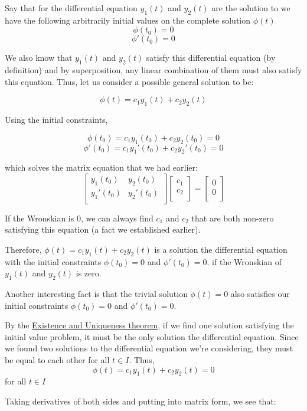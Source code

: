 \documentclass{report}
\begin{document}
Say that for the differential equation $y_1(t)$ and $y_2(t)$ are the solution to we have the following arbitrarily initial values on the complete solution $\phi(t)$
$$\phi(t_0) = 0$$
$$\phi'(t_0) = 0$$


We also know that $y_1(t)$ and $y_2(t)$ satisfy this differential equation (by definition) and by superposition, any linear combination of them must also satisfy this equation. Thus, let us consider a possible  general solution to be:

$$\phi(t) = c_1y_1(t) +c_2y_2(t)$$

Using the initial constraints,

$$\phi(t_0) = c_1y_1(t_0) +c_2y_2(t_0) = 0$$
$$\phi'(t_0) = c_1y_1'(t_0) +c_2y_2'(t_0) = 0$$

which solves the matrix equation that we had earlier:
$$
\begin{bmatrix}
    y_1(t_0) & y_2(t_0) \\
    y_1'(t_0) & y_2'(t_0) \\
\end{bmatrix}
\begin{bmatrix}
    c_1 \\
    c_2 \\
\end{bmatrix}
=
\begin{bmatrix}
    0 \\
    0 \\
\end{bmatrix}
$$

If the Wronskian is 0, we can always find $c_1$ and $c_2$ that are both non-zero satisfying this equation (a fact we established earlier). 

Therefore, $\phi(t) = c_1y_1(t) + c_2y_2(t)$ is a solution the differential equation with the initial constraints $\phi(t_0) = 0$ and $\phi'(t_0) = 0$. if the Wronskian of $y_1(t)$ and $y_2(t)$ is zero. 

Another interesting fact is that the trivial solution $\phi(t) = 0$ also satisfies our initial constraints $\phi(t_0) = 0$ and $\phi'(t_0) = 0$.

By the  \hyperref[th:Ex&Un]{Existence and Uniqueness theorem}, if we find one solution satisfying the initial value problem, it must be the only solution the differential equation. Since we found two solutions to the differential equation we're considering, they must be equal to each other for all $t \in I$.
Thus,
$$\phi(t) = c_1y_1(t) +c_2y_2(t) = 0$$
for all $t \in I$

Taking derivatives of both sides and putting into matrix form, we see that:
\end{document}
